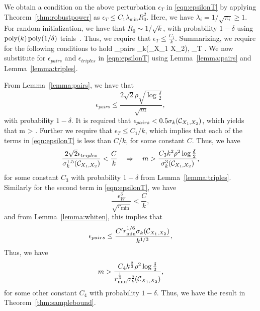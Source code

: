We obtain a condition on the above perturbation $\epsilon_T$ in \eqref{eqn:epsilonT} by applying Theorem~\ref{thm:robustpower} as
$ \epsilon_T\leq C_1\lambda_{\min} R_0^2$. Here, we have $\lambda_{i} = 1/\sqrt{\pi_{i}}\geq 1$. For random initialization, we have that $R_0 \sim 1/\sqrt{k}$, with probability $1-\delta$ using $\operatorname{poly}(k) \operatorname{poly}(1/\delta)$ trials~\cite[Thm. 5.1]{AnandkumarEtal:tensor12}. Thus, we require that $ \epsilon_T  \leq \frac{C_1}{k}$. Summarizing, we require for the following conditions to hold
\beq\epsilon_{pairs} \sigma_k(\Ccal_{X_1 X_2}), \quad \epsilon_T  \leq {}.\eeq
We now substitute for $\epsilon_{pairs}$ and $\epsilon_{triples}$ in \eqref{eqn:epsilonT} using Lemma~\ref{lemma:pairs} and Lemma~\ref{lemma:triples}. 



From Lemma~\ref{lemma:pairs}, we have that 
\[ \epsilon_{pairs}  \leqslant \frac{2\sqrt{2}\rho \sqrt{\log\frac{\delta}{2}}}{\sqrt{m}}, \]with probability $1-\delta$. It is required that $\epsilon_{pairs} < 0.5 \sigma_k(\mathcal{C}_{X_1, X_2})$, which yields that \beq\label{eqn:cond1} m > .\eeq
Further we require that $\epsilon_T \leq C_1/k$, which implies that each of the terms in \eqref{eqn:epsilonT} is less than $C/k$, for some constant $C$. Thus, we have
\[ \frac{2\sqrt{2} \epsilon_{triples}}{\sigma_k^{1.5}(\Ccal_{X_1, X_2})} < \frac{C}{k}\quad\Rightarrow\quad m > \frac{C_3 k^2 \rho^2 \log \frac{\delta}{2}}{\sigma_k^{3}(\Ccal_{X_1, X_2})},\]
for some constant $C_3$ with probability $1-\delta$ from Lemma~\ref{lemma:triples}. Similarly for the second term in \eqref{eqn:epsilonT}, we have
\[\frac{\epsilon_W^3}{\sqrt{r_{\min}}}< \frac{C}{k},\]and from Lemma~\ref{lemma:whiten}, this implies that \[ \epsilon_{pairs} \leq \frac{C' r_{\min}^{1/6} \sigma_k(\Ccal_{X_1, X_2})}{k^{1/3}\iffalse(1+\sigma_{k+1}(\Ccal_{X_1, X_2}))\fi},\]Thus, we have
\[  m > \frac{C_4 k^{\frac{2}{3}} \rho^2 \log\frac{\delta}{2}\iffalse (1+\sigma_{k+1}(\Ccal_{X_1, X_2}))^2\fi}{r_{\min}^{\frac{1}{3}} \sigma^2_k(\Ccal_{X_1, X_2})}, \]for some other constant $C_4$ with probability $1-\delta$. \iffalse Additionally, we also require
\[ (1+\sigma_{k+1}(\Ccal_{X_1, X_2}))\sigma_{k+1}(\Ccal_{X_1, X_2})\leq \frac{C_5 r_{\min}^{1/6} \sigma_k(\Ccal_{X_1, X_2})}{k^{1/3}}.\]\fi
 Thus, we have the result in Theorem~\ref{thm:samplebound}.
 

